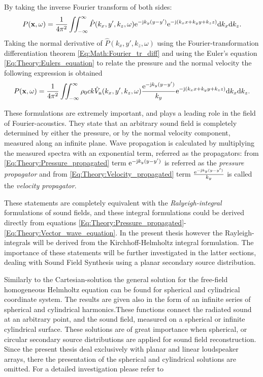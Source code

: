 By taking the inverse Fourier transform of both sides:
\begin{equation}
P(\mathbf{x},\omega) = \frac{1}{4\pi^2}\iint_{-\infty}^{\infty} \hat{P}(k_x,y',k_z,\omega) \mathrm{e}^{-\mathrm{j} k_y ( y - y' ) }  \mathrm{e}^{- \mathrm{j} \left( k_x x + k_y y + k_z z \right) }
\mathrm{d} k_x\mathrm{d} k_z.
\label{Eq:Theory:Pressure_propagated}
\end{equation}
Taking the normal derivative of $\hat{P}(k_x,y',k_z,\omega)$ using the Fourier-transformation differentiation theorem \eqref{Eq:Math:Fourier_tr_diff} and using the Euler's equation \eqref{Eq:Theory:Eulers_equation} to relate the pressure and the normal velocity the following expression is obtained
\begin{equation}
P(\mathbf{x},\omega) = \frac{1}{4\pi^2}\iint_{-\infty}^{\infty} \rho_0 c k\hat{V}_{\mathrm{n}}(k_x,y',k_z,\omega) \frac{\mathrm{e}^{-\mathrm{j} k_y ( y - y' ) } }{k_y} \mathrm{e}^{- \mathrm{j} \left( k_x x + k_y y + k_z z \right) }
\mathrm{d} k_x\mathrm{d} k_z.
\label{Eq:Theory:Velocity_propagated}
\end{equation}

These formulations are extremely important, and plays a leading role in the field of Fourier-acoustics. They state that an arbitrary sound field is completely determined by either the pressure, or by the normal velocity component, measured along an infinite plane. Wave propagation is calculated by multiplying the measured spectra with an exponential term, referred as the propagators: from \eqref{Eq:Theory:Pressure_propagated} term $\mathrm{e}^{-\mathrm{j} k_y ( y - y' ) }$ is referred as the \emph{pressure propagator} and from \eqref{Eq:Theory:Velocity_propagated} term $\frac{\mathrm{e}^{-\mathrm{j} k_y ( y - y' ) } }{k_y}$ is called the \emph{velocity propagator}.

These statements are completely equivalent with the \emph{Ralyeigh-integral} formulations of sound fields, and these integral formulations could be derived directly from equations \eqref{Eq:Theory:Pressure_propagated}-\eqref{Eq:Theory:Vector_wave_equation}. In the present thesis however the Rayleigh-integrals will be derived from the Kirchhoff-Helmholtz integral formulation.
The importance of these statements will be further investigated in the latter sections, dealing with Sound Field Synthesis using a planar secondary source distribution.

\vspace{3mm}
Similarly to the Cartesian-solution the general solution for the free-field homogeneous Helmholtz equation can be found for spherical and cylindrical coordinate system. The results are given also in the form of an infinite series of spherical and cylindrical harmonics.These functions connect the radiated sound at an arbitrary point, and the sound field, measured on a spherical or infinite cylindrical surface. These solutions are of great importance when spherical, or circular secondary source distributions are applied for sound field reconstruction. Since the present thesis deal exclusively with planar and linear loudspeaker arrays, there the presentation of the spherical and cylindrical solutions are omitted. For a detailed investigation
please refer to \cite{Williams1999, Zotter2009phd, Ahrens2012}

